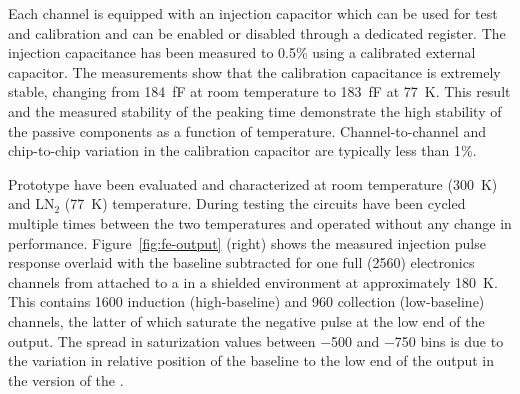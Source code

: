 Each   channel is equipped with an injection capacitor which can be used
for test and calibration and can be enabled or disabled through a
dedicated register. The injection capacitance has been measured to \num{0.5}\% using 
a calibrated external capacitor. The measurements show
that the calibration capacitance is extremely stable, changing from
\SI{184}{fF} at room temperature to \SI{183}{fF} at \SI{77}{K}. This result and the measured
stability of the peaking time demonstrate the high stability of the
passive components as a function of temperature. Channel-to-channel and chip-to-chip
variation in the calibration capacitor are typically less than \num{1}\%. 

Prototype  have been evaluated and characterized at room temperature (\SI{300}{K}) and LN$_2$
(\SI{77}{K}) temperature.
During testing the circuits have been cycled multiple times
between the two temperatures and operated without any change in performance.
Figure~\ref{fig:fe-output} (right) shows the measured injection pulse response overlaid with the baseline subtracted for one full  
(\num{2560}) electronics channels from   attached to a   in a 
shielded environment at approximately \SI{180}{K}. This contains \num{1600} induction (high-baseline)
and \num{960} collection (low-baseline) channels, the latter of which saturate the negative pulse at the low 
end of the  output. The spread in saturization values between \num{-500} and \num{-750}  bins is due to the
variation in relative position of the  baseline to the low end of the  output 
in the  version of the .



